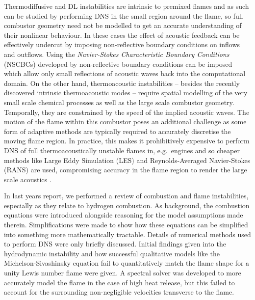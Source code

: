 Thermodiffusive and DL instabilities are intrinsic to premixed flames and as such can be studied by performing DNS in the small region around the flame, so full combustor geometry need not be modelled to get an accurate understanding of their nonlinear behaviour. In these cases the effect of acoustic feedback can be effectively undercut by imposing non-reflective boundary conditions on inflows and outflows. Using the \emph{Navier-Stokes Characteristic Boundary Conditions} (NSCBCs) developed by \cite{thompson1990TimeDependentBoundaryConditions, poinsot1992BoundaryConditionsDirect, poinsot2001TheoreticalNumericalCombustion, sutherland2003ImprovedBoundaryConditions} non-reflective boundary conditions can be imposed which allow only small reflections of acoustic waves back into the computational domain. On the other hand, thermoacoustic instabilities -- besides the recently discovered intrinsic thermoacoustic modes \cite{silva2023IntrinsicThermoacousticInstabilities} -- require spatial modelling of the very small scale chemical processes as well as the large scale combustor geometry. Temporally, they are constrained by the speed of the implied acoustic waves. The motion of the flame within this combustor poses an additional challenge as some form of adaptive methods are typically required to accurately discretise the moving flame region. In practice, this makes it prohibitively expensive to perform DNS of full thermoacoustically unstable flames in, e.g.\ engines and so cheaper methods like Large Eddy Simulation (LES) and Reynolds-Averaged Navier-Stokes (RANS) are used, compromising accuracy in the flame region to render the large scale acoustics \cite{yang2015LargeEddySimulationPresent, domingo2023RecentDevelopmentsDNS}.

In last years report, we performed a review of combustion and flame instabilities, especially as they relate to hydrogen combustion. As background, the combustion equations were introduced alongside reasoning for the model assumptions made therein. Simplifications were made to show how these equations can be simplified into something more mathematically tractable. Details of numerical methods used to perform DNS were only briefly discussed. Initial findings given into the hydrodynamic instability and how successful qualitative models like the Michelson-Sivashinsky equation \cite{sivashinsky1977NonlinearAnalysisHydrodynamic, michelson1977NonlinearAnalysisHydrodynamic} fail to quantitatively match the flame shape for a unity Lewis number flame were given. A spectral solver was developed to more accurately model the flame in the case of high heat release, but this failed to account for the surrounding non-negligible velocities transverse to the flame.


